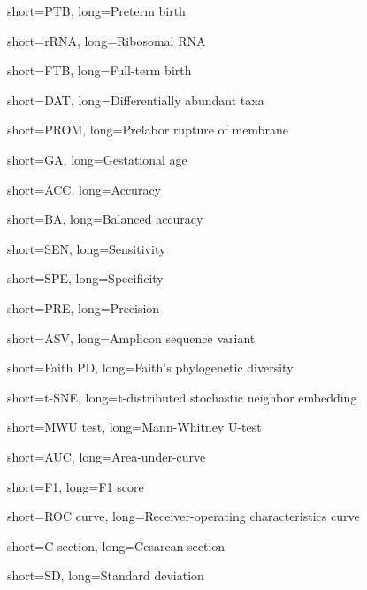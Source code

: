 {
    short=PTB,
    long=Preterm birth
}

{
    short=rRNA,
    long=Ribosomal RNA
}

{
    short=FTB,
    long=Full-term birth
}

{
    short=DAT,
    long=Differentially abundant taxa
}

{
    short=PROM,
    long=Prelabor rupture of membrane
}

{
    short=GA,
    long=Gestational age
}

{
    short=ACC,
    long=Accuracy
}

{
    short=BA,
    long=Balanced accuracy
}

{
    short=SEN,
    long=Sensitivity
}

{
    short=SPE,
    long=Specificity
}

{
    short=PRE,
    long=Precision
}

{
    short=ASV,
    long=Amplicon sequence variant
}

{
    short=Faith PD,
    long=Faith's phylogenetic diversity
}

{
    short=t-SNE,
    long=t-distributed stochastic neighbor embedding
}

{
    short=MWU test,
    long=Mann-Whitney U-test
}

{
    short=AUC,
    long=Area-under-curve 
}

{
    short=F1,
    long=F1 score
}

{
    short=ROC curve,
    long=Receiver-operating characteristics curve
}

{
    short=C-section,
    long=Cesarean section
}

{
    short=SD,
    long=Standard deviation
}

